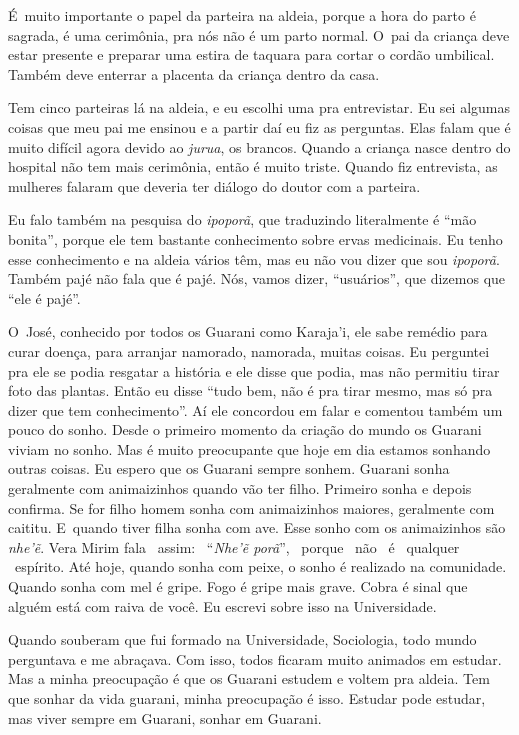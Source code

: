 É~muito importante o papel da parteira na aldeia, porque a hora do parto
é sagrada, é uma cerimônia, pra nós não é um parto normal. O~pai da
criança deve estar presente e preparar uma estira de taquara para
cortar o cordão umbilical. Também deve enterrar a placenta da criança
dentro da casa.

Tem cinco parteiras lá na aldeia, e eu escolhi uma pra entrevistar. Eu
sei algumas coisas que meu pai me ensinou e a partir daí eu fiz as
perguntas. Elas falam que é muito difícil agora devido ao \emph{jurua}, os
brancos. Quando a criança nasce dentro do hospital não tem mais
cerimônia, então é muito triste. Quando fiz entrevista, as mulheres
falaram que deveria ter diálogo do doutor com a parteira. 

Eu falo também na pesquisa do \emph{ipoporã}, que traduzindo literalmente é
``mão bonita'', porque ele tem bastante conhecimento sobre ervas
medicinais. Eu tenho esse conhecimento e na aldeia vários têm, mas eu
não vou dizer que sou \emph{ipoporã}. Também pajé não fala que é pajé. Nós,
vamos dizer, ``usuários'', que dizemos que ``ele é pajé''.

O~José, conhecido por todos os Guarani como Karaja’i, ele sabe remédio
para curar doença, para arranjar namorado, namorada, muitas coisas. Eu
perguntei pra ele se podia resgatar a história e ele disse que podia,
mas não permitiu tirar foto das plantas. Então eu disse ``tudo bem, não
é pra tirar mesmo, mas só pra dizer que tem conhecimento''. Aí ele
concordou em falar e comentou também um pouco do sonho. Desde o
primeiro momento da criação do mundo os Guarani viviam no sonho. Mas é
muito preocupante que hoje em dia estamos sonhando outras coisas. Eu
espero que os Guarani sempre sonhem. Guarani sonha geralmente com
animaizinhos quando vão ter filho. Primeiro sonha e depois confirma. Se
for filho homem sonha com animaizinhos maiores, geralmente com caititu.
E~quando tiver filha sonha com ave. Esse sonho com os animaizinhos são
\emph{nhe’ẽ}. Vera Mirim fala ~assim: ~``\emph{Nhe’ẽ porã}'', ~porque ~não ~é
~qualquer ~espírito. Até hoje, quando sonha com peixe, o sonho é
realizado na comunidade. Quando sonha com mel é gripe. Fogo é gripe
mais grave. Cobra é sinal que alguém está com raiva de você. Eu escrevi
sobre isso na Universidade.

Quando souberam que fui formado na Universidade, Sociologia, todo mundo
perguntava e me abraçava. Com isso, todos ficaram muito animados em
estudar. Mas a minha preocupação é que os Guarani estudem e voltem pra
aldeia. Tem que sonhar da vida guarani, minha preocupação é isso.
Estudar pode estudar, mas viver sempre em Guarani, sonhar em Guarani.

